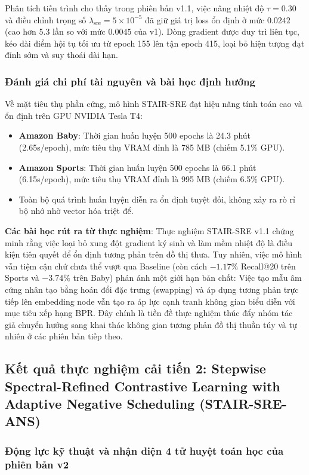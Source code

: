 Phân tích tiến trình cho thấy trong phiên bản v1.1, việc nâng nhiệt độ $\tau = 0.30$ và điều chỉnh trọng số $\lambda_{\text{sre}} = 5 \times 10^{-5}$ đã giữ giá trị loss ổn định ở mức $0.0242$ (cao hơn 5.3 lần so với mức $0.0045$ của v1). Dòng gradient được duy trì liên tục, kéo dài điểm hội tụ tối ưu từ epoch 155 lên tận epoch 415, loại bỏ hiện tượng đạt đỉnh sớm và suy thoái dài hạn.

\subsubsection{Đánh giá chi phí tài nguyên và bài học định hướng}
Về mặt tiêu thụ phần cứng, mô hình STAIR-SRE đạt hiệu năng tính toán cao và ổn định trên GPU NVIDIA Tesla T4:
\begin{itemize}[leftmargin=*]
    \item \textbf{Amazon Baby}: Thời gian huấn luyện 500 epochs là 24.3 phút (2.65s/epoch), mức tiêu thụ VRAM đỉnh là 785 MB (chiếm 5.1\% GPU).
    \item \textbf{Amazon Sports}: Thời gian huấn luyện 500 epochs là 66.1 phút (6.15s/epoch), mức tiêu thụ VRAM đỉnh là 995 MB (chiếm 6.5\% GPU).
    \item Toàn bộ quá trình huấn luyện diễn ra ổn định tuyệt đối, không xảy ra rò rỉ bộ nhớ nhờ vector hóa triệt để.
\end{itemize}
\noindent\textbf{Các bài học rút ra từ thực nghiệm}: Thực nghiệm STAIR-SRE v1.1 chứng minh rằng việc loại bỏ xung đột gradient ký sinh và làm mềm nhiệt độ là điều kiện tiên quyết để ổn định tương phản trên đồ thị thưa. Tuy nhiên, việc mô hình vẫn tiệm cận chứ chưa thể vượt qua Baseline (còn cách $-1.17\%$ Recall@20 trên Sports và $-3.74\%$ trên Baby) phản ánh một giới hạn bản chất: Việc tạo mẫu âm cứng nhân tạo bằng hoán đổi đặc trưng (swapping) và áp dụng tương phản trực tiếp lên embedding node vẫn tạo ra áp lực cạnh tranh không gian biểu diễn với mục tiêu xếp hạng BPR. Đây chính là tiền đề thực nghiệm thúc đẩy nhóm tác giả chuyển hướng sang khai thác không gian tương phản đồ thị thuần túy và tự nhiên ở các phiên bản tiếp theo.

\subsection{Kết quả thực nghiệm cải tiến 2: Stepwise Spectral-Refined Contrastive Learning with Adaptive Negative Scheduling (STAIR-SRE-ANS)}
\label{sec:stair_sre_ans}

\subsubsection{Động lực kỹ thuật và nhận diện 4 tử huyệt toán học của phiên bản v2}

